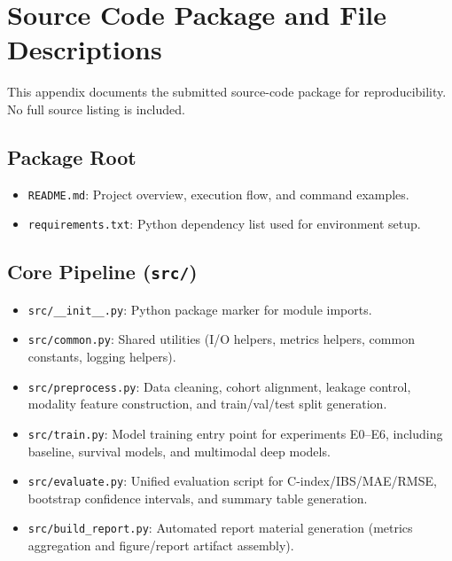 ﻿%
\appendix
\section{Source Code Package and File Descriptions}

This appendix documents the submitted source-code package for reproducibility. 
No full source listing is included.

\subsection{Package Root}
\begin{itemize}
\item \texttt{README.md}: Project overview, execution flow, and command examples.
\item \texttt{requirements.txt}: Python dependency list used for environment setup.
\end{itemize}

\subsection{Core Pipeline (\texttt{src/})}
\begin{itemize}
\item \texttt{src/\_\_init\_\_.py}: Python package marker for module imports.
\item \texttt{src/common.py}: Shared utilities (I/O helpers, metrics helpers, common constants, logging helpers).
\item \texttt{src/preprocess.py}: Data cleaning, cohort alignment, leakage control, modality feature construction, and train/val/test split generation.
\item \texttt{src/train.py}: Model training entry point for experiments E0--E6, including baseline, survival models, and multimodal deep models.
\item \texttt{src/evaluate.py}: Unified evaluation script for C-index/IBS/MAE/RMSE, bootstrap confidence intervals, and summary table generation.
\item \texttt{src/build\_report.py}: Automated report material generation (metrics aggregation and figure/report artifact assembly).
\end{itemize}

